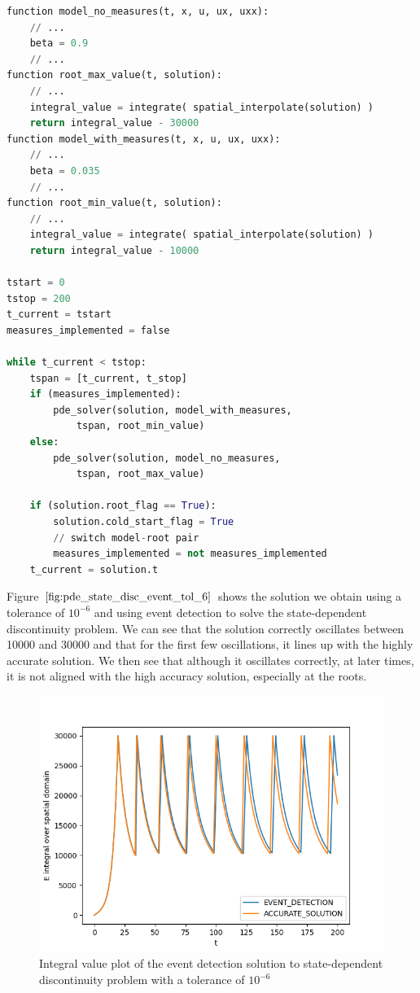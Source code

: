 \documentclass{article}
\begin{document}
\begin{minipage}{\linewidth}
\begin{lstlisting}[language=Python]
function model_no_measures(t, x, u, ux, uxx):
	// ...
	beta = 0.9
	// ...
function root_max_value(t, solution):
	// ...
	integral_value = integrate( spatial_interpolate(solution) )
	return integral_value - 30000
function model_with_measures(t, x, u, ux, uxx):
	// ...
	beta = 0.035
	// ...
function root_min_value(t, solution):
	// ...
	integral_value = integrate( spatial_interpolate(solution) )
	return integral_value - 10000

tstart = 0
tstop = 200
t_current = tstart
measures_implemented = false

while t_current < tstop:
	tspan = [t_current, t_stop]
	if (measures_implemented):
		pde_solver(solution, model_with_measures, 
			tspan, root_min_value)
	else:
		pde_solver(solution, model_no_measures, 
			tspan, root_max_value)
	
	if (solution.root_flag == True):
		solution.cold_start_flag = True
		// switch model-root pair
		measures_implemented = not measures_implemented
	t_current = solution.t

\end{lstlisting}
\end{minipage}

Figure $\ref{fig:pde_state_disc_event_tol_6}$ shows the solution we obtain using a tolerance of $10^{-6}$ and using event detection to solve the state-dependent discontinuity problem. We can see that the solution correctly oscillates between 10000 and 30000 and that for the first few oscillations, it lines up with the highly accurate solution. We then see that although it oscillates correctly, at later times, it is not aligned with the high accuracy solution, especially at the roots. 

\begin{figure}[H]
\centering
\includegraphics[width=0.7\linewidth]{./figures/pde_state_disc_event_tol_6}
\caption{Integral value plot of the event detection solution to state-dependent discontinuity problem with a tolerance of $10^{-6}$}
\label{fig:pde_state_disc_event_tol_6}
\end{figure}
\end{document}
